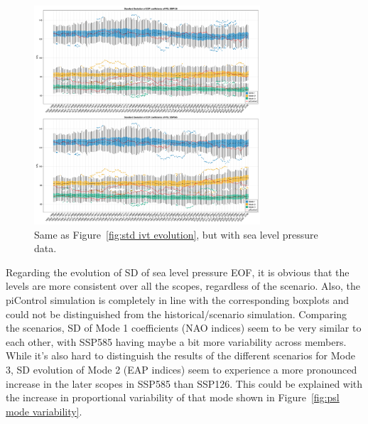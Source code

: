 \begin{figure}
  \begin{center}
    \includegraphics[width=0.75\textwidth]{figures/std_psl_50seasons_tempmodescale_3modes.png}
  \end{center}
  \caption{Same as Figure~\ref{fig:std ivt evolution}, but with sea level pressure data.}
  \label{fig:std psl evolution}
\end{figure}

Regarding the evolution of SD of sea level pressure EOF, it is obvious that the levels are more consistent over all the scopes, regardless of the scenario. 
Also, the piControl simulation is completely in line with the corresponding boxplots and could not be distinguished from the historical/scenario simulation. 
Comparing the scenarios, SD of Mode 1 coefficients (NAO indices) seem to be very similar to each other, with SSP585 having maybe a bit more variability across members. 
While it's also hard to distinguish the results of the different scenarios for Mode 3, SD evolution of Mode 2 (EAP indices) seem to experience a more pronounced increase in the later scopes in SSP585 than SSP126.  
This could be explained with the increase in proportional variability of that mode shown in Figure~\ref{fig:psl mode variability}.



